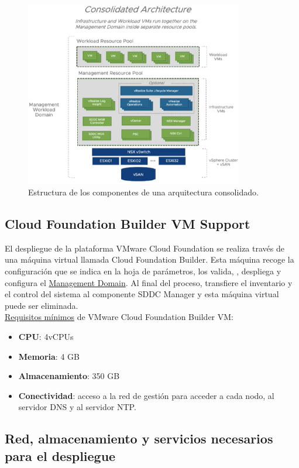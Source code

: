 \begin{figure}[h!]
  \centering
  \includegraphics[width=0.85\textwidth]{imaxes/conceptosPrevios/consolidatedArch.png}
  \caption{Estructura de los componentes de una arquitectura consolidado.}
  \label{fig:consolidatedArch}
\end{figure}
\FloatBarrier

\subsection{Cloud Foundation Builder VM Support}
\label{subsec:cloudBuilder}
El despliegue de la plataforma VMware Cloud Foundation se realiza través de una máquina virtual llamada Cloud Foundation Builder. Esta máquina recoge la configuración que se indica en la hoja de parámetros, los valida, , despliega y configura el \underline{Management Domain}. Al final del proceso, transfiere el inventario y el control del sistema al componente SDDC Manager y esta máquina virtual puede ser eliminada.\\
\underline{Requisitos mínimos} de VMware Cloud Foundation Builder VM:
\begin{itemize}
    \item \textbf{CPU}: 4vCPUs
    \item \textbf{Memoria}: 4 GB
    \item \textbf{Almacenamiento}: 350 GB
    \item \textbf{Conectividad}: acceso a la red de gestión para acceder a cada nodo, al servidor DNS y al servidor NTP.
\end{itemize}

\subsection{Red, almacenamiento y servicios necesarios para el despliegue}

